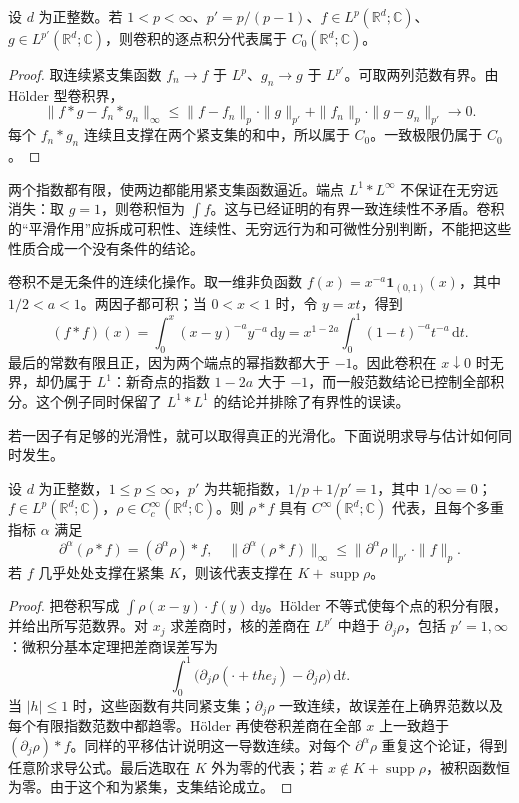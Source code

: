 \begin{corollary}\label{b2:cor:03-convolution-c0}
设 \(d\) 为正整数。若 \(1<p<\infty\)、\(p'=p/(p-1)\)、\(f\in L^p(\mathbb R^d;\mathbb C)\)、\(g\in L^{p'}(\mathbb R^d;\mathbb C)\)，则卷积的逐点积分代表属于 \(C_0(\mathbb R^d;\mathbb C)\)。
\end{corollary}
\begin{proof}
取连续紧支集函数 \(f_n\to f\) 于 \(L^p\)、\(g_n\to g\) 于 \(L^{p'}\)。可取两列范数有界。由 Hölder 型卷积界，
\[
 \|f*g-f_n*g_n\|_\infty
 \leq\|f-f_n\|_p\cdot\|g\|_{p'}
 +\|f_n\|_p\cdot\|g-g_n\|_{p'}\longrightarrow0.
\]
每个 \(f_n*g_n\) 连续且支撑在两个紧支集的和中，所以属于 \(C_0\)。一致极限仍属于 \(C_0\)。
\end{proof}

两个指数都有限，使两边都能用紧支集函数逼近。端点 \(L^1*L^\infty\) 不保证在无穷远消失：取 \(g=1\)，则卷积恒为 \(\int f\)。这与已经证明的有界一致连续性不矛盾。卷积的“平滑作用”应拆成可积性、连续性、无穷远行为和可微性分别判断，不能把这些性质合成一个没有条件的结论。

卷积不是无条件的连续化操作。取一维非负函数 \(f(x)=x^{-a}\mathbf1_{(0,1)}(x)\)，其中 \(1/2<a<1\)。两因子都可积；当 \(0<x<1\) 时，令 \(y=xt\)，得到
\[
 (f*f)(x)=\int_0^x(x-y)^{-a}y^{-a}\,\mathrm dy
 =x^{1-2a}\int_0^1(1-t)^{-a}t^{-a}\,\mathrm dt.
\]
最后的常数有限且正，因为两个端点的幂指数都大于 \(-1\)。因此卷积在 \(x\downarrow0\) 时无界，却仍属于 \(L^1\)：新奇点的指数 \(1-2a\) 大于 \(-1\)，而一般范数结论已控制全部积分。这个例子同时保留了 \(L^1*L^1\) 的结论并排除了有界性的误读。

\ProseParagraphBreak

若一因子有足够的光滑性，就可以取得真正的光滑化。下面说明求导与估计如何同时发生。

\begin{proposition}\label{b2:prop:03-smooth-convolution}
设 \(d\) 为正整数，\(1\leq p\leq\infty\)，\(p'\) 为共轭指数，\(1/p+1/p'=1\)，其中 \(1/\infty=0\)；\(f\in L^p(\mathbb R^d;\mathbb C)\)，\(\rho\in C_c^\infty(\mathbb R^d;\mathbb C)\)。则 \(\rho*f\) 具有 \(C^\infty(\mathbb R^d;\mathbb C)\) 代表，且每个多重指标 \(\alpha\) 满足
\[
 \partial^\alpha(\rho*f)=(\partial^\alpha\rho)*f,\quad
 \|\partial^\alpha(\rho*f)\|_\infty
 \leq\|\partial^\alpha\rho\|_{p'}\cdot\|f\|_p.
\]
若 \(f\) 几乎处处支撑在紧集 \(K\)，则该代表支撑在 \(K+\operatorname{supp}\rho\)。
\end{proposition}
\begin{proof}
把卷积写成 \(\int\rho(x-y)\cdot f(y)\,\mathrm dy\)。Hölder 不等式使每个点的积分有限，并给出所写范数界。对 \(x_j\) 求差商时，核的差商在 \(L^{p'}\) 中趋于 \(\partial_j\rho\)，包括 \(p'=1,\infty\)：微积分基本定理把差商误差写为
\[
 \int_0^1\bigl(\partial_j\rho(\cdot+the_j)-\partial_j\rho\bigr)\,\mathrm dt.
\]
当 \(|h|\leq1\) 时，这些函数有共同紧支集；\(\partial_j\rho\) 一致连续，故误差在上确界范数以及每个有限指数范数中都趋零。Hölder 再使卷积差商在全部 \(x\) 上一致趋于 \((\partial_j\rho)*f\)。同样的平移估计说明这一导数连续。对每个 \(\partial^\alpha\rho\) 重复这个论证，得到任意阶求导公式。最后选取在 \(K\) 外为零的代表；若 \(x\notin K+\operatorname{supp}\rho\)，被积函数恒为零。由于这个和为紧集，支集结论成立。
\end{proof}

